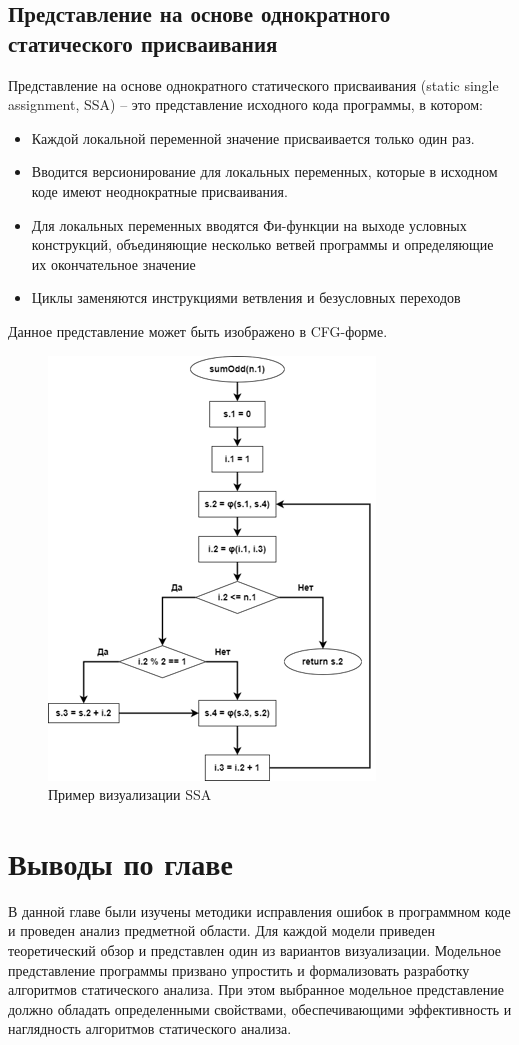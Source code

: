 \subsection{Представление на основе однократного статического присваивания} \label{ch1:subsec-title-abbr}
Представление на основе однократного статического присваивания (static single assignment, SSA) – это представление исходного кода программы, в котором:
\begin{itemize}
\item Каждой локальной переменной значение присваивается только один раз.
\item Вводится версионирование для локальных переменных, которые в исходном коде имеют неоднократные присваивания.
\item Для локальных переменных вводятся Фи-функции на выходе условных конструкций, объединяющие несколько ветвей программы и определяющие их окончательное значение
\item Циклы заменяются инструкциями ветвления и безусловных переходов
\end{itemize}
Данное представление может быть изображено в CFG-форме.
\begin{figure}[h]
	\center
	\includegraphics [scale=1] {my_folder/images/my/7}
	\caption{Пример визуализации SSA}
	\label{fig:7}  
\end{figure}
\section{Выводы по главе} \label{ch1:sec3}
В данной главе были изучены методики исправления ошибок в программном коде и проведен анализ предметной области. Для каждой модели приведен теоретический обзор и представлен один из вариантов визуализации. Модельное представление программы призвано упростить и формализовать разработку алгоритмов статического анализа. При этом выбранное модельное представление должно обладать определенными свойствами, обеспечивающими эффективность и наглядность алгоритмов статического анализа.
\newpage





